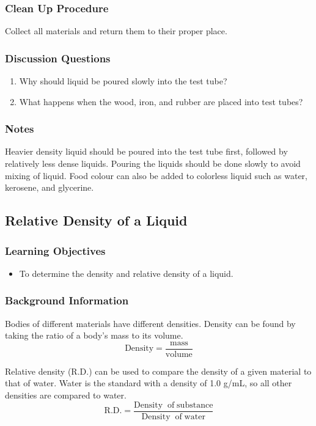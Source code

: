 \subsubsection*{Clean Up Procedure}
Collect all materials and return them to their proper place.

\subsubsection*{Discussion Questions}
\begin{enumerate}
\item{Why should liquid be poured slowly into the test tube?}
\item{What happens when the wood, iron, and rubber are placed into test tubes?} 
\end{enumerate}

\subsubsection*{Notes}
Heavier density liquid should be poured into the test tube first, followed by relatively less dense liquids. Pouring the liquids should be done slowly to avoid mixing of liquid. Food colour can also be added to colorless liquid such as water, kerosene, and glycerine.  

\subsection{Relative Density of a Liquid}

\subsubsection*{Learning Objectives}
\begin{itemize}
\item{To determine the density and relative density of a liquid.} 
\end{itemize}

\subsubsection*{Background Information}
Bodies of different materials have different densities.  Density can be found by taking the ratio of a body's mass to its volume.  $$\mathrm{Density} = \frac{\mathrm{mass}}{\mathrm{volume}}$$

Relative density (R.D.) can be used to compare the density of a given material to that of water.  Water is the standard with a density of 1.0 g/mL, so all other densities are compared to water.
$$\mathrm{R.D.} = \frac{\mathrm{Density\; \; of \;substance}}{\mathrm{Density\; \;of \;water}}$$

